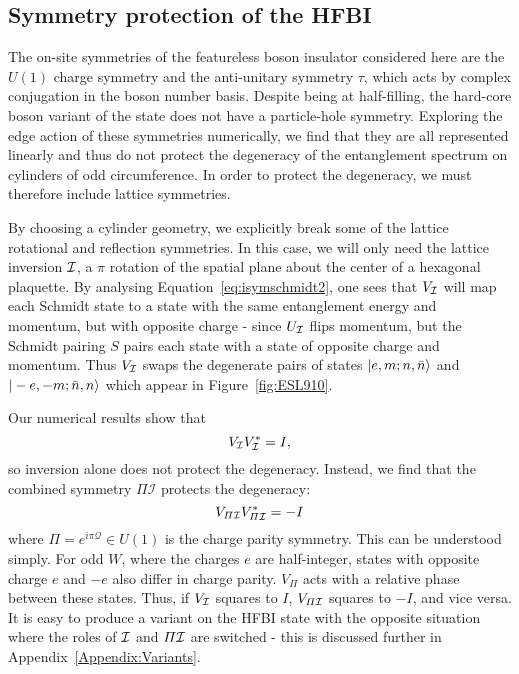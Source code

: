 \subsection{Symmetry protection of the HFBI}

The on-site symmetries of the featureless boson insulator considered here
are the $U(1)$ charge symmetry and the 
anti-unitary symmetry $\tau$, which acts by complex conjugation in the boson number basis.
Despite being at half-filling, the hard-core boson variant of the state does not have a particle-hole
symmetry. Exploring the edge action of these symmetries numerically, we find that they are all
represented linearly and thus do not protect the degeneracy of the entanglement spectrum
on cylinders of odd circumference.
In order to protect the degeneracy, we must therefore include lattice symmetries.

By choosing a cylinder geometry, we explicitly break some of the lattice rotational
and reflection symmetries. In this case, we will only need the lattice inversion $\mathcal{I}$,
a $\pi$ rotation of the spatial plane about the center of a hexagonal plaquette. 
By analysing Equation~\ref{eq:isymschmidt2}, one sees that $V_{\mathcal{I}}$ will map each Schmidt 
state to a state with the same entanglement energy and momentum, but with opposite charge -
since $U_{\mathcal{I}}$ flips momentum, but the Schmidt pairing $S$ pairs each state with a state of
opposite charge and momentum. 
Thus $V_{\mathcal{I}}$ swaps the degenerate pairs of states $\vert e, m; n, \bar{n} \rangle$ and
$\vert -e, -m; \bar{n}, n \rangle$ which appear in Figure~\ref{fig:ESL910}. 

Our numerical results show that 
$$
V_{\mathcal{I}} V_{\mathcal{I}}^* = I, 
$$
so inversion alone does not protect the degeneracy. Instead, we find that the
combined symmetry $\varPi \mathcal{I}$ protects the degeneracy:
$$
V_{\varPi \mathcal{I}} V_{\varPi \mathcal{I}}^* = -I 
$$
where $\varPi = e^{i \pi \mathcal{Q}} \in U(1)$ is the charge parity symmetry.
This can be understood simply. For odd $W$, where the charges $e$ are half-integer,
states with opposite charge $e$ and $-e$ also differ in charge parity. $V_{\varPi}$
acts with a relative phase between these states. Thus, if $V_{\mathcal{I}}$ squares
to $I$, $V_{\varPi \mathcal{I}}$ squares to $-I$, and vice versa.  
It is easy to produce a variant on the HFBI state with the opposite situation where
the roles of $\mathcal{I}$ and $\varPi \mathcal{I}$ are switched - this is discussed further in 
Appendix~\ref{Appendix:Variants}.

